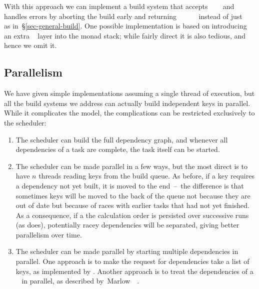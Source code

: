 \noindent
With this approach we can implement a build system that accepts
~~~ and handles errors by aborting the
build early and returning
~~~~~ instead of just
~~~ as in~\S\ref{sec-general-build}. One possible
implementation is based on introducing an extra ~ layer
into the monad stack; while fairly direct it is also tedious, and hence we omit
it.


\subsection{Parallelism}\label{sec-parallelism}

We have given simple implementations assuming a single thread of execution,
but all the build systems we address can actually build independent keys in
parallel. While it complicates the model, the complications can be restricted
exclusively to the scheduler:

\begin{enumerate}
\item The  scheduler can build the full dependency graph, and
whenever all dependencies of a task are complete, the task itself can be
started.

\item The  scheduler can be made parallel in a few ways, but the
most direct is to have $n$ threads reading keys from the build queue. As before,
if a key requires a dependency not yet built, it is moved to the end~--~the
difference is that sometimes keys will be moved to the back of the queue not
because they are out of date but because of races with earlier tasks that had
not yet finished. As a consequence, if a the calculation order is persisted over
successive runs (as \Excel does), potentially racey dependencies will be
separated, giving better parallelism over time.

\item The  scheduler can be made parallel by starting multiple
dependencies in parallel. One approach is to make the request for dependencies
take a list of keys, as implemented by \Shake. Another approach is to treat the
 dependencies of a ~ in parallel, as
described by~Marlow~\etal~.
\end{enumerate}


